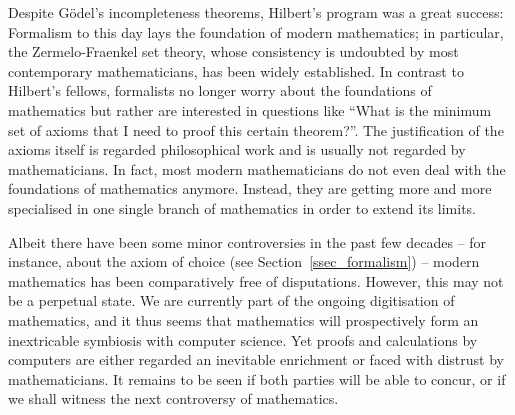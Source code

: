 \documentclass{article}
\begin{document}
Despite Gödel's incompleteness theorems, Hilbert's program was a great success: Formalism to this day lays the foundation of modern mathematics; in particular, the Zermelo-Fraenkel set theory, whose consistency is undoubted by most contemporary mathematicians, has been widely established.
In contrast to Hilbert's fellows, formalists no longer worry about the foundations of mathematics but rather are interested in questions like ``What is the minimum set of axioms that I need to proof this certain theorem?''. The justification of the axioms itself is regarded philosophical work and is usually not regarded by mathematicians. In fact, most modern mathematicians do not even deal with the foundations of mathematics anymore. Instead, they are getting more and more specialised in one single branch of mathematics in order to extend its limits.

Albeit there have been some minor controversies in the past few decades -- for instance, about the axiom of choice (see Section~\ref{ssec_formalism}) -- modern mathematics has been comparatively free of disputations. However, this may not be a perpetual state. We are currently part of the ongoing digitisation of mathematics, and it thus seems that mathematics will prospectively form an inextricable symbiosis with computer science. Yet proofs and calculations by computers are either regarded an inevitable enrichment or faced with distrust by mathematicians. It remains to be seen if both parties will be able to concur, or if we shall witness the next controversy of mathematics.

\newpage
{}


\end{document}
